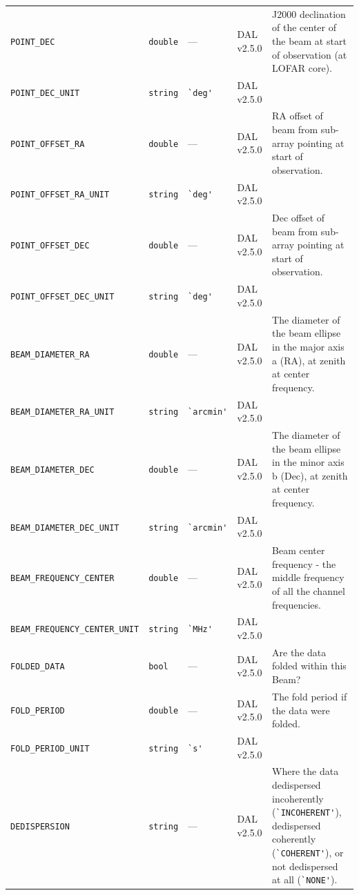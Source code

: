 \documentclass[a4paper,10pt,bibtotoc]{scrartcl}
\begin{document}
\begin{supertabular}{|llllp{5.0cm}|}
  \small{\verb|POINT_DEC|}  & \verb|double| & --- & DAL v2.5.0 & J2000 declination of the center of the
  beam at start of observation (at LOFAR core). \\
  \small{\verb|POINT_DEC_UNIT|}  & \verb|string| & \verb|`deg'| & DAL v2.5.0 & \\
  \small{\verb|POINT_OFFSET_RA|}  & \verb|double| & --- & DAL v2.5.0 & RA offset of beam from sub-array pointing at start of observation. \\
  \small{\verb|POINT_OFFSET_RA_UNIT|}  & \verb|string| & \verb|`deg'| & DAL v2.5.0 & \\
  \small{\verb|POINT_OFFSET_DEC|}  & \verb|double| & --- & DAL v2.5.0 & Dec offset of beam from sub-array pointing at start of observation. \\
  \small{\verb|POINT_OFFSET_DEC_UNIT|}  & \verb|string| & \verb|`deg'| & DAL v2.5.0 & \\
  \small{\verb|BEAM_DIAMETER_RA|}  & \verb|double| & --- & DAL v2.5.0 & The diameter of the beam ellipse in the major axis a (RA), at zenith at center frequency. \\
  \small{\verb|BEAM_DIAMETER_RA_UNIT|}  & \verb|string| & \verb|`arcmin'| & DAL v2.5.0 & \\
  \small{\verb|BEAM_DIAMETER_DEC|}  & \verb|double| & --- & DAL v2.5.0 & The diameter of the beam ellipse in the minor axis b (Dec), at zenith at center frequency. \\
  \small{\verb|BEAM_DIAMETER_DEC_UNIT|}  & \verb|string| & \verb|`arcmin'| & DAL v2.5.0 & \\
  \small{\verb|BEAM_FREQUENCY_CENTER|}  & \verb|double| & --- & DAL v2.5.0 & Beam center
  frequency - the middle frequency of all the channel frequencies. \\
  \small{\verb|BEAM_FREQUENCY_CENTER_UNIT|}  & \verb|string| & \verb|`MHz'| & DAL v2.5.0 & \\
  \small{\verb|FOLDED_DATA|}  & \verb|bool| & --- & DAL v2.5.0 &  Are the data folded within
  this Beam? \\
  \small{\verb|FOLD_PERIOD|}     & \verb|double| & --- & DAL v2.5.0 & The fold period if the
  data were folded. \\
  \small{\verb|FOLD_PERIOD_UNIT|}     & \verb|string| & \verb|`s'| & DAL v2.5.0 & \\
  \small{\verb|DEDISPERSION|}     & \verb|string| & --- & DAL v2.5.0 & Where the
  data dedispersed incoherently (\verb|`INCOHERENT'|), dedispersed coherently
  (\verb|`COHERENT'|), or not dedispersed at all (\verb|`NONE'|). \\

\end{supertabular}
\end{document}
